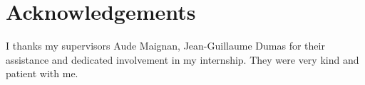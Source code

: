 \chapter{Acknowledgements}
I thanks my supervisors Aude Maignan, Jean-Guillaume Dumas for their assistance and dedicated involvement in my internship. They were very kind and patient with me.